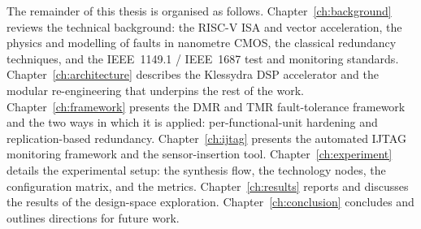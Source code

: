 The remainder of this thesis is organised as follows.
Chapter~\ref{ch:background} reviews the technical background: the RISC-V ISA and
vector acceleration, the physics and modelling of faults in nanometre CMOS, the
classical redundancy techniques, and the IEEE~1149.1 / IEEE~1687 test and
monitoring standards.
Chapter~\ref{ch:architecture} describes the Klessydra DSP accelerator and the
modular re-engineering that underpins the rest of the work.
Chapter~\ref{ch:framework} presents the DMR and TMR fault-tolerance framework
and the two ways in which it is applied: per-functional-unit hardening and
replication-based redundancy.
Chapter~\ref{ch:ijtag} presents the automated IJTAG monitoring framework and the
sensor-insertion tool.
Chapter~\ref{ch:experiment} details the experimental setup: the synthesis flow,
the technology nodes, the configuration matrix, and the metrics.
Chapter~\ref{ch:results} reports and discusses the results of the design-space
exploration.
Chapter~\ref{ch:conclusion} concludes and outlines directions for future work.
